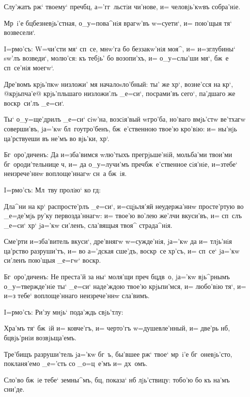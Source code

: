 Слу'жатъ рж` твоему` преч бц, 
а='гг~льстiи чи'нове, и= человjь'кwвъ собра'нiе.

Мр~i'е бц безневjь'стная, о_у=пова^нiя врагw'въ 
w=суети`, и= пою'щыя тя` возвесели`.


I=рмо'съ: W=чи'сти мя` сп~се, мнw'га бо беззакw'нiя 
моя^, и= и=з\ъ глубины` sw'лъ возведи`, молю'ся: къ 
тебjь' бо возопи'хъ, и= о_у=слы'ши мя`, бж~е сп~се'нiя 
моегw`.

Дре'вомъ крjь'пкw низложи' мя началоsло'бный: ты' же 
хр`, возне'сся на кр`, @крjьпча'е@ 
{крjь'пльшаго} низложи'лъ _е=си`, посрами'въ сего`, 
па'дшаго же воскр~си'лъ _е=си`.

Ты` о_у=ще'дрилъ _е=си` сiw'на, возсiя'вый w\т гро'ба, 
но'ваго вмjь'стw ве'тхагw соверши'въ, jа='кw 
бл~гоутро'бенъ, бж~е'ственною твое'ю кро'вiю: и= ны'нjь 
ца'рствуеши въ не'мъ во вjь'ки, хр`.

Бг~оро'диченъ: Да и=зба'вимся w\т лю'тыхъ 
прегрjьше'нiй, мольба'ми твои'ми бг~ороди'тельнице 
ч, и= да о_у=лучи'мъ преч бж~е'ственное 
сiя'нiе, и=з\ъ тебе` неизрече'ннw воплоще'ннагw сн~а 
бж~iя.

 I=рмо'съ: Мл~тву пролiю` ко гд:

Дла^ни на кр` распросте'рлъ _е=си`, и=сцjьля'яй 
неудержа'ннw просте'ртую во _е=де'мjь ру'ку 
первозда'ннагw: и= твое'ю во'лею же'лчи вкуси'въ, и= 
сп~слъ _е=си` хр` jа='кw си'ленъ, сла'вящыя твоя^ 
страда^нiя.

Сме'рти и=зба'витель вкуси`, дре'внягw w=сужде'нiя, 
jа='кw да и= тлjь'нiя ца'рство разруши'тъ, и= во а='дская 
сше'дъ, воскр~се хр'съ, и= сп~се` jа='кw си'ленъ 
пою'щыя _е=гw` воскр.

Бг~оро'диченъ: Не преста'й за ны` моля'щи преч 
бц дв~о, jа='кw вjь^рнымъ о_у=твержде'нiе ты` _е=си` 
наде'ждою твое'ю крjьпи'мся, и= любо'вiю тя`, и= и=з\ъ 
тебе` воплоще'ннаго неизрече'ннw сла'вимъ.

 I=рмо'съ: Ри'зу мнjь` пода'ждь свjь'тлу:

Хра'мъ тя` бж~iй и= ковче'гъ, и= черто'гъ 
w=душевле'нный, и= две'рь нб, бц вjь'рнiи 
возвjьща'емъ.

Тре'бищъ разруши'тель jа='кw бг~ъ, бы'вшее рж` 
твое` мр~i'е бг~оневjь'сто, покланя'емо _е='сть со 
_о=ц~е'мъ и= дх~омъ.

Сло'во бж~iе тебе` земны^мъ, бц, показа` нб 
лjь'ствицу: тобо'ю бо къ на'мъ сни'де.

